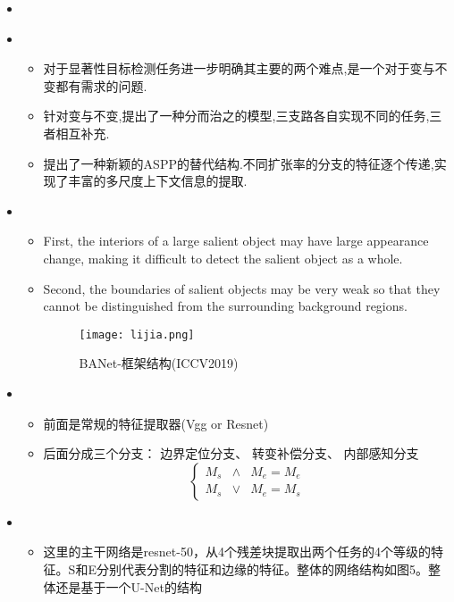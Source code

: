 \begin{itemize}[leftmargin=*]
	\item
	{
	}
	\item
	{\small
		\begin{itemize}
			\item 对于显著性目标检测任务进一步明确其主要的两个难点,是一个对于变与不变都有需求的问题.
			\item 针对变与不变,提出了一种分而治之的模型,三支路各自实现不同的任务,三者相互补充.
			\item 提出了一种新颖的ASPP的替代结构.不同扩张率的分支的特征逐个传递,实现了丰富的多尺度上下文信息的提取.
		\end{itemize}
	}
	\item 
	{\small
		\begin{itemize}
			\item First, the interiors of a large salient object may have large appearance change, making it difficult to detect the salient object as a whole.
			\item Second, the boundaries of salient objects may be very weak so that they cannot be distinguished from the surrounding background regions.
			\begin{figure}
				\centering
				\texttt{[image: lijia.png]}
				\caption{BANet-框架结构(ICCV2019)\label{sa}}
			\end{figure}
		\end{itemize}
	}
	\item
	{\small
		\begin{itemize}
			\item 前面是常规的特征提取器(Vgg or Resnet) 
			\item 后面分成三个分支：
			边界定位分支、
			转变补偿分支、
			内部感知分支
			\begin{equation}\left\{\begin{array}{ccc}
			M_{s} & \wedge & M_{e}=M_{e} \\
			M_{s} & \vee & M_{e}=M_{s}
			\end{array}\right.\end{equation}
		\end{itemize}
	}
	\item
	{\small
		\begin{itemize}
			\item 这里的主干网络是resnet-50，从4个残差块提取出两个任务的4个等级的特征。S和E分别代表分割的特征和边缘的特征。整体的网络结构如图5。整体还是基于一个U-Net的结构

\end{itemize}}
\end{itemize}
